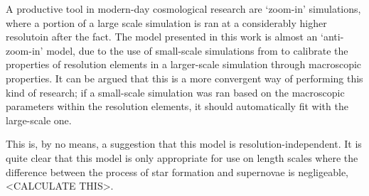 A productive tool in modern-day cosmological research are `zoom-in' simulations, where a portion of a large scale simulation is ran at a considerably higher resolutoin after the fact.
The model presented in this work is almost an `anti-zoom-in' model, due to the use of small-scale simulations from \citet{martizzi2015} to calibrate the properties of resolution elements in a larger-scale simulation through macroscopic properties.
It can be argued that this is a more convergent way of performing this kind of research; if a small-scale simulation was ran based on the macroscopic parameters within the resolution elements, it should automatically fit with the large-scale one.

This is, by no means, a suggestion that this model is resolution-independent.
It is quite clear that this model is only appropriate for use on length scales where the difference between the process of star formation and supernovae is negligeable, <CALCULATE THIS>.
